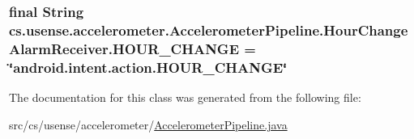 \subsubsection[{H\+O\+U\+R\+\_\+\+C\+H\+A\+N\+G\+E}]{\setlength{\rightskip}{0pt plus 5cm}final String cs.\+usense.\+accelerometer.\+Accelerometer\+Pipeline.\+Hour\+Change\+Alarm\+Receiver.\+H\+O\+U\+R\+\_\+\+C\+H\+A\+N\+G\+E = \char`\"{}android.\+intent.\+action.\+H\+O\+U\+R\+\_\+\+C\+H\+A\+N\+G\+E\char`\"{}\hspace{0.3cm}{\ttfamily [static]}}\label{classcs_1_1usense_1_1accelerometer_1_1_accelerometer_pipeline_1_1_hour_change_alarm_receiver_a193681af2b8dcefcd9fd5f1591c8cf17}


The documentation for this class was generated from the following file\+:\begin{DoxyCompactItemize}
\item 
src/cs/usense/accelerometer/\hyperlink{_accelerometer_pipeline_8java}{Accelerometer\+Pipeline.\+java}\end{DoxyCompactItemize}
